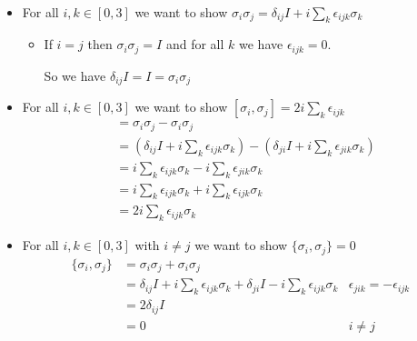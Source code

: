 ~

\begin{itemize}
  \item For all $i, k \in [0, 3]$ we want to show
    $\sigma_i \sigma_j = \delta_{ij} I + i \sum_k \epsilon_{ijk} \sigma_k$

    \begin{itemize}
      \item If $i=j$ then $\sigma_i \sigma_j = I$ and for all $k$ we have
        $\epsilon_{ijk} = 0$.

        So we have $\delta_{ij} I = I = \sigma_i \sigma_j$
    \end{itemize}

  \item For all $i, k \in [0, 3]$ we want to show $[\sigma_i, \sigma_j] = 
    2i \sum_k \epsilon_{ijk}$
    \begin{align*}
      [\sigma_i, \sigma_j] &= \sigma_i \sigma_j - \sigma_i \sigma_j \\
      &= (\delta_{ij} I + i \sum_k \epsilon_{ijk} \sigma_k) -
         (\delta_{ji} I + i \sum_k \epsilon_{jik} \sigma_k) \\
      &= i \sum_k \epsilon_{ijk} \sigma_k - i \sum_k \epsilon_{jik} \sigma_k \\
      &= i \sum_k \epsilon_{ijk} \sigma_k + i \sum_k \epsilon_{ijk} \sigma_k \\
      &= 2i \sum_k \epsilon_{ijk} \sigma_k
    \end{align*}
  \item For all $i, k \in [0, 3]$ with $i\not = j$ we want to show $\{\sigma_i, \sigma_j\} = 0$
    \begin{align*}
      \{\sigma_i, \sigma_j\} &= \sigma_i \sigma_j + \sigma_i \sigma_j \\
      &= \delta_{ij} I + i \sum_k \epsilon_{ijk} \sigma_k +
         \delta_{ji} I - i \sum_k \epsilon_{ijk} \sigma_k & \epsilon_{jik} =
         -\epsilon_{ijk}\\
      &= 2 \delta_{ij} I \\
      &= 0 & i \not = j
    \end{align*}
\end{itemize}


